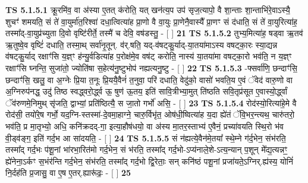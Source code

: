 \documentclass[17pt]{extarticle}
\begin{document}
                                        \textbf{ TS 5.1.5.1} \newline
                  क्रू॒रमि॑व॒ वा अ॑स्या ए॒तत् क॑रोति॒ यत् खन॑त्य॒प उप॑ सृज॒त्यापो॒ वै शा॒न्ताः शा॒न्ताभि॑रे॒वाऽस्यै॒ शुचꣳ॑ शमयति॒ सं ते॑ वा॒युर्मा॑त॒रिश्वा॑ दधा॒त्वित्या॑ह प्रा॒णो वै वा॒युः प्रा॒णेनै॒वास्यै᳚ प्रा॒णꣳ सं द॑धाति॒ सं ते॑ वा॒युरित्या॑ह॒ तस्मा᳚द्-वा॒युप्र॑च्युता दि॒वो वृष्टि॑रीर्ते॒ तस्मै॑ च देवि॒ वष॑डस्तु॒ - [  ] \textbf{  21} \newline
                  \newline
                                \textbf{ TS 5.1.5.2} \newline
                  तुभ्य॒मित्या॑ह॒ षड्वा ऋ॒तव॑ ऋ॒तुष्वे॒व वृष्टिं॑ दधाति॒ तस्मा॒थ् सर्वा॑नृ॒तून्. व॑र्.षति॒ यद्-व॑षट्कु॒र्याद्-या॒तया॑माऽस्य वषट्का॒रः स्या॒द्यन्न व॑षट्कु॒र्याद् रक्षाꣳ॑सि य॒ज्ञ्ꣳ ह॑न्यु॒र्वडित्या॑ह प॒रोक्ष॑मे॒व वष॑ट् करोति॒ नास्य॑ या॒तया॑मा वषट्का॒रो भव॑ति॒ न य॒ज्ञ्ꣳ रक्षाꣳ॑सि घ्नन्ति॒ सुजा॑तो॒ ज्योति॑षा स॒हेत्य॑नु॒ष्टुभोप॑ नह्यत्यनु॒ष्टु - [  ] \textbf{  22} \newline
                  \newline
                                \textbf{ TS 5.1.5.3} \newline
                  -फ्सर्वा॑णि॒ छन्दाꣳ॑सि॒ छन्दाꣳ॑सि॒ खलु॒ वा अ॒ग्नेः प्रि॒या त॒नूः प्रि॒ययै॒वैनं॑ त॒नुवा॒ परि॑ दधाति॒ वेदु॑को॒ वासो॑ भवति॒य ए॒वं ॅवेद॑ वारु॒णो वा अ॒ग्निरुप॑नद्ध॒ उदु॑ तिष्ठ स्वद्ध्वरो॒र्द्ध्व ऊ॒ षुण॑ ऊ॒तय॒ इति॑ सावि॒त्रीभ्या॒मुत् ति॑ष्ठति सवि॒तृप्र॑सूत ए॒वास्यो॒र्द्ध्वां ॅव॑रुणमे॒निमुथ् सृ॑जति॒ द्वाभ्यां॒ प्रति॑ष्ठित्यै॒ स जा॒तो गर्भो॑ असि॒ - [  ] \textbf{  23} \newline
                  \newline
                                \textbf{ TS 5.1.5.4} \newline
                  रोद॑स्यो॒रित्या॑हे॒मे वै रोद॑सी॒ तयो॑रे॒ष गर्भो॒ यद॒ग्नि-स्तस्मा॑-दे॒वमा॒हाग्ने॒ चारु॒र्विभृ॑त॒ ओष॑धी॒ष्वित्या॑ह य॒दा ह्ये॑तं ॅवि॒भर॒न्त्यथ॒ चारु॑तरो॒ भव॑ति॒ प्र मा॒तृभ्यो॒ अधि॒ कनि॑क्रदद्-गा॒ इत्या॒हौष॑धयो॒ वा अ॑स्य मा॒तर॒स्ताभ्य॑ ए॒वैनं॒ प्रच्या॑वयति स्थि॒रो भ॑व वी॒ड्व॑ङ्ग॒ इति॑ गर्द॒भ आ सा॑दयति॒ - [  ] \textbf{  24} \newline
                  \newline
                                \textbf{ TS 5.1.5.5} \newline
                  सं न॑ह्यत्ये॒वैन॑मे॒तया᳚ स्थे॒म्ने ग॑र्द॒भेन॒ संभ॑रति॒ तस्मा᳚द् गर्द॒भः प॑शू॒नां भा॑रभा॒रित॑मो गर्द॒भेन॒ सं भ॑रति॒ तस्मा᳚द् गर्द॒भो-ऽप्य॑नाले॒शे-ऽत्य॒न्यान् प॒शून् मे᳚द्य॒त्यन्नꣳ॒॒ ह्ये॑नेना॒ऽर्कꣳ स॒भंर॑न्ति गर्द॒भेन॒ संभ॑रति॒ तस्मा᳚द् गर्द॒भो द्वि॒रेताः॒ सन् कनि॑ष्ठं पशू॒नां प्रजा॑यते॒ऽग्निर्.ह्य॑स्य॒ योनिं॑ नि॒र्दह॑ति प्र॒जासु॒ वा ए॒ष ए॒तर्.ह्यारू॑ढः॒ - [  ] \textbf{  25} \newline
\end{document}
